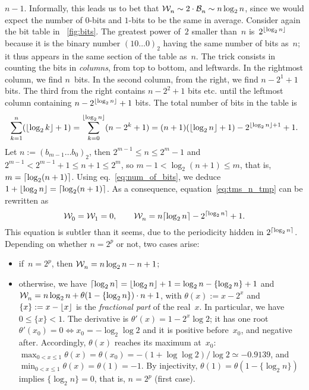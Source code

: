 \(n-1\). Informally, this leads us to bet that \(\mathcal{W}_{n}^{} \sim 2 \cdot
\mathcal{B}_{n}^{} \sim n\log_2 n\), since we would expect the number of \(0\)-bits
and \(1\)-bits to be the same in average. Consider again the bit table
in \fig~\ref{fig:bits}. The greatest power of~\(2\) smaller than~\(n\)
is~\(2^{\lfloor{\log_2 n}\rfloor}\) because it is the binary number
\((10\dots0)_2\) having the same number of bits as~\(n\); it thus
appears in the same section of the table as~\(n\). The trick consists
in counting the bits in \emph{columns}, from top to bottom, and
leftwards. In the rightmost column, we find \(n\)~bits. In the second
column, from the right, we find \(n-2^1+1\) bits. The third from the
right contains \(n-2^2+1\) bits etc. until the leftmost column
containing \(n-2^{\lfloor{\log_2 n}\rfloor}+1\) bits. The total number of bits in
the table is
\begin{equation*}
\abovedisplayskip=2pt
\belowdisplayskip=2pt
\sum_{k=1}^{n}{\!(\floor{\log_2 k}+1)}
   = \sum_{k=0}^{\floor{\log_2 n}}{\!(n-2^k+1)}
   = (n + 1)(\floor{\log_2 n} + 1) - 2^{\floor{\log_2 n}+1} + 1.
\end{equation*}
Let \(n := (b_{m-1}\dots b_0)_2\), then \(2^{m-1} \leqslant n
\leqslant 2^m - 1\) and \(2^{m-1} < 2^{m-1} + 1 \leqslant n + 1
\leqslant 2^m\), so \(m-1 < \log_2(n+1) \leqslant m\), that is, \(m =
\lceil{\log_2(n+1)}\rceil\). Using eq.~\eqref{eq:num_of_bits}, we deduce \(1
+ \lfloor{\log_2 n}\rfloor = \lceil{\log_2(n+1)}\rceil\). As a consequence,
equation~\eqref{eq:tms_n_tmp} can be rewritten as
\begin{equation}
\mathcal{W}_{0}^{} = \mathcal{W}_{1}^{} = 0,
\qquad
\mathcal{W}_{n}^{} = n\lceil{\log_2 n}\rceil - 2^{\lceil{\log_2 n}\rceil} + 1.
\label{eq:top}
\end{equation}
This equation is subtler than it seems, due to the periodicity hidden
in \(2^{\lceil{\log_2 n}\rceil}\). Depending on whether \(n = 2^p\) or not,
two cases arise:
\begin{itemize}

  \item if~\(n=2^p\), then \(\mathcal{W}_{n}^{} = n\log_2 n - n +
    1\);

  \item otherwise, we have \(\lceil{\log_2 n}\rceil = \lfloor{\log_2 n}\rfloor + 1 = \log_2
    n - \{\log_2 n\} + 1\) and \(\mathcal{W}_{n}^{} = n\log_2 n + \theta(1 - \{\log_2 n\})
    \cdot n + 1\), with \(\theta(x) := x - 2^x\) and \(\{x\} := x -
    \lfloor{x}\rfloor\) is the \emph{fractional part} of the real~\(x\). In
    particular, we have \(0 \leqslant \{x\} < 1\). The derivative is
    \(\theta'(x) = 1 - 2^x\log 2\); it has one root \(\theta'(x_0) = 0
    \Leftrightarrow x_0 = -\log_2\log 2\) and it is positive
    before~\(x_0\), and negative after. Accordingly, \(\theta(x)\)
    reaches its maximum at~\(x_0\): \(\max_{0<x\leqslant 1}\theta(x) =
    \theta(x_0) = -(1+\log\log{2})/\!\log{2} \simeq -0.9139\), and
    \(\min_{0<x\leqslant 1}\theta(x) = \theta(1) = -1\). By
    injectivity, \(\theta(1) = \theta(1-\{\log_2 n\})\) implies \(\{\log_2
    n\} = 0\), that is, \(n=2^p\) (first case).
\end{itemize}
